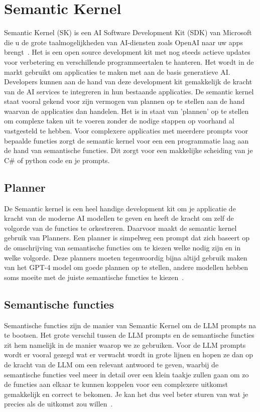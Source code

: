 \section{Semantic Kernel}
Semantic Kernel (SK) is een AI Software Development Kit (SDK) van Microsoft die u de grote taalmogelijkheden van AI-diensten zoals OpenAI naar uw apps brengt~\autocite{Salim}. Het is een open source development kit met nog steeds actieve updates voor verbetering en verschillende programmeertalen te hanteren. Het wordt in de markt gebruikt om applicaties te maken met aan de basis generatieve AI. Developers kunnen aan de hand van deze development kit gemakkelijk de kracht van de AI services te integreren in hun bestaande applicaties. De semantic kernel staat vooral gekend voor zijn vermogen van plannen op te stellen aan de hand waarvan de applicaties dan handelen. Het is in staat van 'plannen' op te stellen om complexe taken uit te voeren zonder de nodige stappen op voorhand al vastgesteld te hebben. Voor complexere applicaties met meerdere prompts voor bepaalde functies zorgt de semantic kernel voor een een programmatie laag aan de hand van semantische functies. Dit zorgt voor een makkelijke scheiding van je C# of python code en je prompts.

\subsection{Planner}
De Semantic kernel is een heel handige development kit om je applicatie de kracht van de  moderne AI modellen te geven en heeft de kracht om zelf de volgorde van de functies te orkestreren. Daarvoor maakt de semantic kernel gebruik van Planners. Een planner is simpelweg een prompt dat zich baseert op de omschrijving van semantische functies om te kiezen welke nodig zijn en in welke volgorde. Deze planners moeten tegenwoordig bijna altijd gebruik maken van het GPT-4 model om goede plannen op te stellen, andere modellen hebben soms moeite met de juiste semantische functies te kiezen~\autocite{Salim}.

\subsection{Semantische functies}
Semantische functies zijn de manier van Semantic Kernel om de LLM prompts na te bootsen. Het grote verschil tussen de LLM prompts en de semantische functies zit hem namelijk in de manier waarop we ze gebruiken. Voor de LLM prompts wordt er vooral gezegd wat er verwacht wordt in grote lijnen en hopen ze dan op de kracht van de LLM om een relevant antwoord te geven, waarbij de semantische functies veel meer in detail over een klein taakje zullen gaan om zo de functies aan elkaar te kunnen koppelen voor een complexere uitkomst gemakkelijk en correct te bekomen. Je kan het dus veel beter sturen van wat je precies als de uitkomst zou willen~\autocite{Salim}. 

